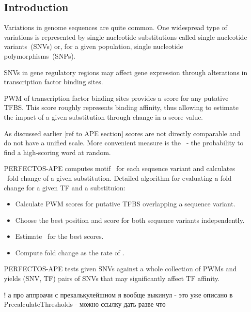 \subsection{Introduction}
Variations in genome sequences are quite common. One widespread type of variations is represented by single nucleotide substitutions called single nucleotide variants~(SNVs) or, for a given population, single nucleotide polymorphisms~(SNPs).

SNVs in gene regulatory regions may affect gene expression through alterations in transcription factor binding sites.

PWM of transcription factor binding sites provides a score for any putative TFBS.
This score roughly represents binding affinity, thus allowing to estimate 
the impact of a given substitution through change in a score value.

As discussed earlier [ref to APE section] scores are not directly comparable and do not have a unified scale. More convenient measure is the \pvalue\ - the probability to find a high-scoring word at random.

PERFECTOS-APE computes motif \pvalues\ for each sequence variant and calculates \pvalue\ fold change of a given substitution. Detailed algorithm for evaluating a fold change for a given TF and a substituion:

\begin{itemize}
\item Calculate PWM scores for putative TFBS overlapping a sequence variant.
\item Choose the best position and score for both sequence variants independently.
\item Estimate \pvalues\ for the best scores.
\item Compute fold change as the rate of \pvalues.
\end{itemize}

PERFECTOS-APE tests given SNVs against a whole collection of PWMs and yields (SNV, TF) pairs of SNVs that may significantly affect TF affinity.

! а про аппроачи с прекалькулейшном я вообще выкинул - это уже описано в PrecalculateThresholds - можно ссылку дать разве что

